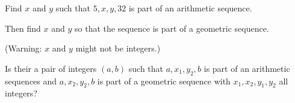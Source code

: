 \documentclass[11pt,]{book}
\theoremstyle{ptxplainnotitle}
\theoremstyle{ptxplaintitle}
\theoremstyle{ptxdefinitionnotitle}
\theoremstyle{ptxdefinitiontitle}
\theoremstyle{ptxdefinitionnotitle}
\theoremstyle{ptxdefinitiontitle}
\theoremstyle{ptxdefinitionnotitle}
\theoremstyle{ptxdefinitiontitle}
\theoremstyle{ptxdefinitiontitlenonumber}
\theoremstyle{ptxdefinitiontitlenonumber}
\numberwithin{equation}{chapter}
\begin{document}
\begin{divisionexercise}{9}\hypertarget{exercise-21}{}
\hypertarget{p-324}{}%
Find \(x\) and \(y\) such that \(5, x, y, 32\) is part of an arithmetic sequence.%
\par
\hypertarget{p-325}{}%
Then find \(x\) and \(y\) so that the sequence is part of a geometric sequence.%
\par
\hypertarget{p-326}{}%
(Warning: \(x\) and \(y\) might not be integers.)%
\end{divisionexercise}%
\begin{divisionexercise}{10}\hypertarget{exercise-22}{}
\hypertarget{p-328}{}%
Is their a pair of integers \((a,b)\) such that \(a, x_1, y_2, b\) is part of an arithmetic sequences and \(a, x_2, y_2, b\) is part of a geometric sequence with \(x_1, x_2, y_1, y_2\) all integers?%
\end{divisionexercise}%
\end{document}
